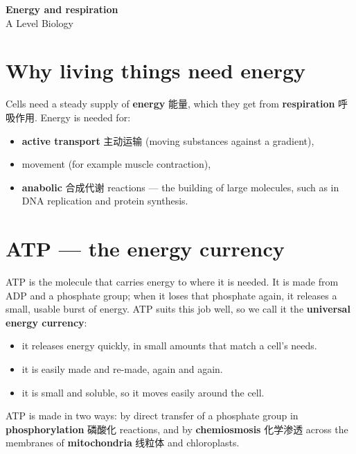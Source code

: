 \documentclass[11pt]{article}
\begin{document}
\begin{center}
  {\LARGE\bfseries Energy and respiration}\\[0.35em]
  {\large A Level Biology}
\end{center}
\vspace{0.6em}

\section*{Why living things need energy}

Cells need a steady supply of \textbf{energy} 能量, which they get from \textbf{respiration} 呼吸作用. Energy is needed for:

\begin{itemize}
\item \textbf{active transport} 主动运输 (moving substances against a gradient),

\item movement (for example muscle contraction),

\item \textbf{anabolic} 合成代谢 reactions — the building of large molecules, such as in DNA replication and protein synthesis.

\end{itemize}

\section*{ATP — the energy currency}

ATP is the molecule that carries energy to where it is needed. It is made from ADP and a phosphate group; when it loses that phosphate again, it releases a small, usable burst of energy. ATP suits this job well, so we call it the \textbf{universal energy currency}:

\begin{itemize}
\item it releases energy quickly, in small amounts that match a cell's needs.

\item it is easily made and re-made, again and again.

\item it is small and soluble, so it moves easily around the cell.

\end{itemize}

ATP is made in two ways: by direct transfer of a phosphate group in \textbf{phosphorylation} 磷酸化 reactions, and by \textbf{chemiosmosis} 化学渗透 across the membranes of \textbf{mitochondria} 线粒体 and chloroplasts.
\end{document}
